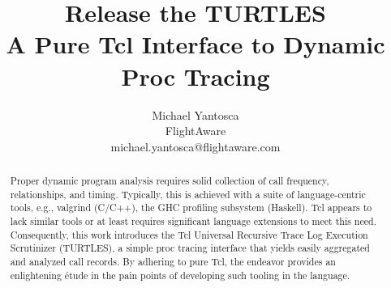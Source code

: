 \documentclass{article}[letter,10pt]
\title{Release the TURTLES\\
  \large{A Pure Tcl Interface to Dynamic Proc Tracing}}
\author{
  Michael Yantosca\\
  FlightAware \\
  michael.yantosca@flightaware.com
}
\begin{document}
\maketitle

\begin{abstract}
  Proper dynamic program analysis requires solid collection of call frequency,
  relationships, and timing. Typically, this is achieved with a suite of
  language-centric tools, e.g., valgrind (C/C++), the GHC profiling subsystem
  (Haskell). Tcl appears to lack similar tools or at least requires significant
  language extensions to meet this need. Consequently, this work introduces
  the Tcl Universal Recursive Trace Log Execution Scrutinizer (TURTLES), a
  simple proc tracing interface that yields easily aggregated and analyzed
  call records. By adhering to pure Tcl, the endeavor provides an enlightening
  étude in the pain points of developing such tooling in the language.
\end{abstract}

\tableofcontents
\end{document}
